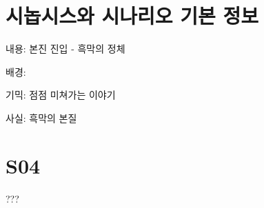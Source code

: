 \documentclass{report}
\begin{document}
	\section{시놉시스와 시나리오 기본 정보}
		내용: 본진 진입 - 흑막의 정체
		
		배경: 
		
		기믹: 점점 미쳐가는 이야기
		
		사실: 흑막의 본질
	
	\section{S04}
		???
\end{document}
